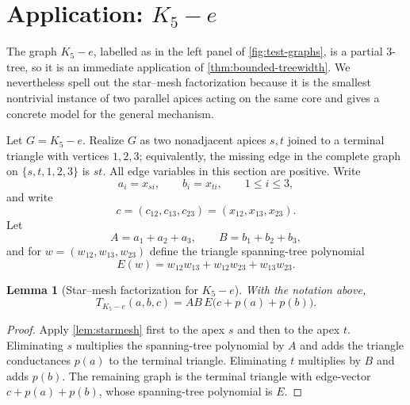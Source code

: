 \documentclass[preprint,12pt,authoryear]{elsarticle}
\numberwithin{equation}{section}
\newtheorem{lemma}[theorem]{Lemma}
\theoremstyle{definition}
\theoremstyle{remark}
\newcommand{\1}{\mathbf{1}}
\begin{document}
\section{Application: \texorpdfstring{$K_5-e$}{K5-e}}
\label{sec:k5e}

The graph \(K_5-e\), labelled as in the left panel of \cref{fig:test-graphs}, is a partial \(3\)-tree, so it is an immediate application of \cref{thm:bounded-treewidth}.  We nevertheless spell out the star--mesh factorization because it is the smallest nontrivial instance of two parallel apices acting on the same core and gives a concrete model for the general mechanism.

Let $G=K_5-e$.  Realize $G$ as two nonadjacent apices $s,t$ joined to a terminal triangle with vertices $1,2,3$; equivalently, the missing edge in the complete graph on $\{s,t,1,2,3\}$ is $st$.  All edge variables in this section are positive.  Write
\begin{equation}
        a_i=x_{si},\qquad b_i=x_{ti},\qquad 1\le i\le3,
\end{equation}
and write
\begin{equation}
        c=(c_{12},c_{13},c_{23})=(x_{12},x_{13},x_{23}).
\end{equation}
Let
\begin{equation}
        A=a_1+a_2+a_3,
        \qquad
        B=b_1+b_2+b_3,
\end{equation}
and for $w=(w_{12},w_{13},w_{23})$ define the triangle spanning-tree polynomial
\begin{equation}
        E(w)=w_{12}w_{13}+w_{12}w_{23}+w_{13}w_{23}.
\end{equation}

\begin{lemma}[Star--mesh factorization for $K_5-e$]
\label{lem:k5e-factor}
With the notation above,
\begin{equation}
        T_{K_5-e}(a,b,c)=AB\,E\bigl(c+p(a)+p(b)\bigr).
\end{equation}
\end{lemma}

\begin{proof}
Apply \cref{lem:starmesh} first to the apex $s$ and then to the apex $t$.  Eliminating $s$ multiplies the spanning-tree polynomial by $A$ and adds the triangle conductances $p(a)$ to the terminal triangle.  Eliminating $t$ multiplies by $B$ and adds $p(b)$.  The remaining graph is the terminal triangle with edge-vector $c+p(a)+p(b)$, whose spanning-tree polynomial is $E$.
\end{proof}
\end{document}
